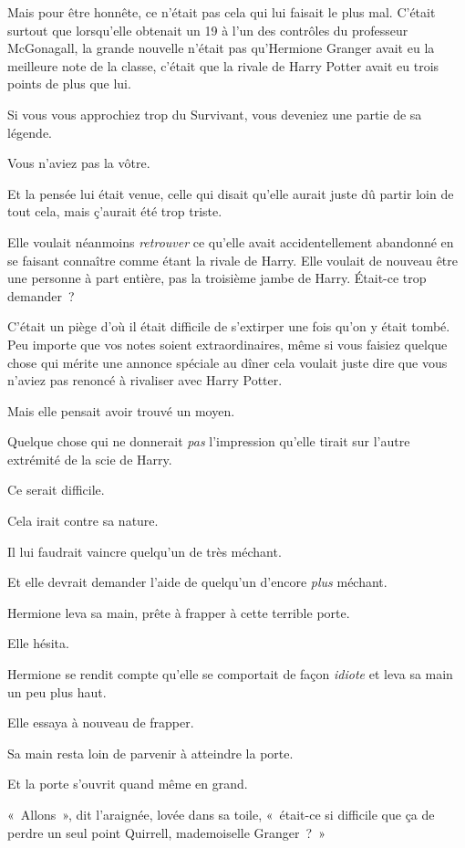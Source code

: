 Mais pour être honnête, ce n'était pas cela qui lui faisait le plus mal.
C'était surtout que lorsqu'elle obtenait un 19 à l'un des contrôles du professeur McGonagall, la grande nouvelle n'était pas qu'Hermione Granger avait eu la meilleure note de la classe, c'était que la rivale de Harry Potter avait eu trois points de plus que lui.

Si vous vous approchiez trop du Survivant, vous deveniez une partie de sa légende.

Vous n'aviez pas la vôtre.

Et la pensée lui était venue, celle qui disait qu'elle aurait juste dû partir loin de tout cela, mais ç'aurait été trop triste.

Elle voulait néanmoins \emph{retrouver} ce qu'elle avait accidentellement abandonné en se faisant connaître comme étant la rivale de Harry.
Elle voulait de nouveau être une personne à part entière, pas la troisième jambe de Harry.
Était-ce trop demander~?

C'était un piège d'où il était difficile de s'extirper une fois qu'on y était tombé.
Peu importe que vos notes soient extraordinaires, même si vous faisiez quelque chose qui mérite une annonce spéciale au dîner cela voulait juste dire que vous n'aviez pas renoncé à rivaliser avec Harry Potter.

Mais elle pensait avoir trouvé un moyen.

Quelque chose qui ne donnerait \emph{pas} l'impression qu'elle tirait sur l'autre extrémité de la scie de Harry.

Ce serait difficile.

Cela irait contre sa nature.

Il lui faudrait vaincre quelqu'un de très méchant.

Et elle devrait demander l'aide de quelqu'un d'encore \emph{plus} méchant.

Hermione leva sa main, prête à frapper à cette terrible porte.

Elle hésita.

Hermione se rendit compte qu'elle se comportait de façon \emph{idiote} et leva sa main un peu plus haut.

Elle essaya à nouveau de frapper.

Sa main resta loin de parvenir à atteindre la porte.

Et la porte s'ouvrit quand même en grand.

«~Allons~», dit l'araignée, lovée dans sa toile, «~était-ce si difficile que ça de perdre un seul point Quirrell, mademoiselle Granger~?~»

